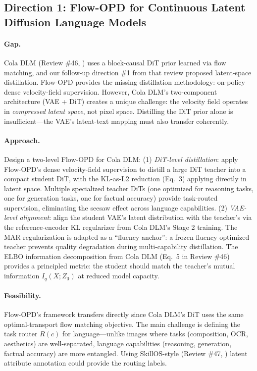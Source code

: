 \documentclass[11pt]{article}
\begin{document}
\subsection{Direction 1: Flow-OPD for Continuous Latent Diffusion Language Models}

\paragraph{Gap.}
Cola DLM (Review \#46, \cite{coladlm}) uses a block-causal DiT prior learned via flow matching, and our follow-up direction \#1 from that review proposed latent-space distillation. Flow-OPD provides the missing distillation methodology: on-policy dense velocity-field supervision. However, Cola DLM's two-component architecture (VAE + DiT) creates a unique challenge: the velocity field operates in \emph{compressed latent space}, not pixel space. Distilling the DiT prior alone is insufficient---the VAE's latent-text mapping must also transfer coherently.

\paragraph{Approach.}
Design a two-level Flow-OPD for Cola DLM: (1) \emph{DiT-level distillation}: apply Flow-OPD's dense velocity-field supervision to distill a large DiT teacher into a compact student DiT, with the KL-as-L2 reduction (Eq.\ 3) applying directly in latent space. Multiple specialized teacher DiTs (one optimized for reasoning tasks, one for generation tasks, one for factual accuracy) provide task-routed supervision, eliminating the seesaw effect across language capabilities. (2) \emph{VAE-level alignment}: align the student VAE's latent distribution with the teacher's via the reference-encoder KL regularizer from Cola DLM's Stage 2 training. The MAR regularization is adapted as a ``fluency anchor'': a frozen fluency-optimized teacher prevents quality degradation during multi-capability distillation. The ELBO information decomposition from Cola DLM (Eq.\ 5 in Review \#46) provides a principled metric: the student should match the teacher's mutual information $I_q(X; Z_0)$ at reduced model capacity.

\paragraph{Feasibility.}
Flow-OPD's framework transfers directly since Cola DLM's DiT uses the same optimal-transport flow matching objective. The main challenge is defining the task router $R(c)$ for language---unlike images where tasks (composition, OCR, aesthetics) are well-separated, language capabilities (reasoning, generation, factual accuracy) are more entangled. Using SkillOS-style (Review \#47, \cite{skillos}) latent attribute annotation could provide the routing labels.
\end{document}
